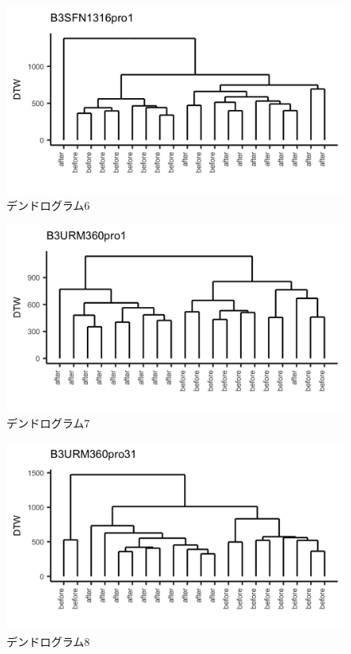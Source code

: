 \documentclass{jarticle}
\begin{document}
\begin{figure}[H]
	\begin{center}
		\includegraphics[width=15cm]{fig/dendro_6.png}
		\caption{デンドログラム6}
		\label{fig:dendro6}
	\end{center}
\end{figure}
\begin{figure}[H]
	\begin{center}
		\includegraphics[width=15cm]{fig/dendro_7.png}
		\caption{デンドログラム7}
		\label{fig:dendro7}
	\end{center}
\end{figure}
\begin{figure}[H]
	\begin{center}
		\includegraphics[width=15cm]{fig/dendro_8.png}
		\caption{デンドログラム8}
		\label{fig:dendro8}
	\end{center}
\end{figure}
\end{document}
